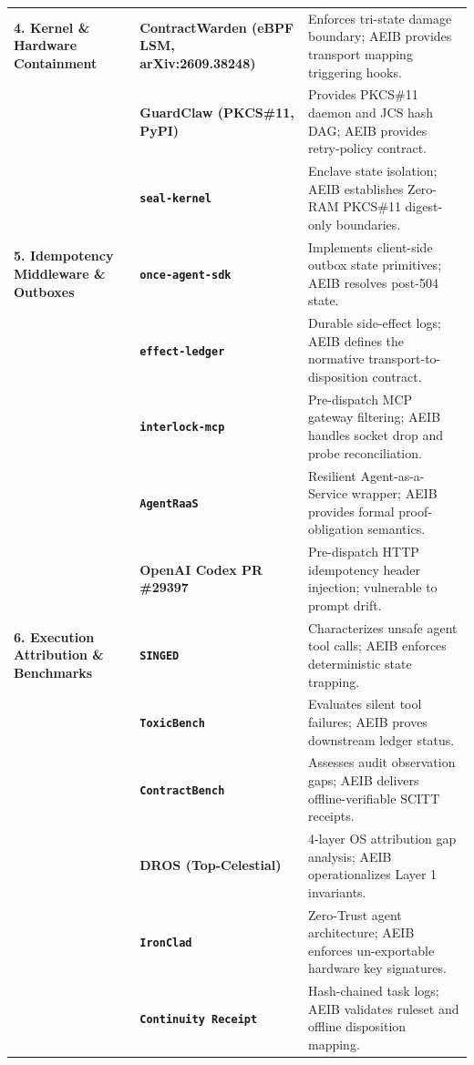 \documentclass[10pt,journal,compsoc]{IEEEtran}
\begin{document}
\begin{table}[t]
\begin{tabular}{lll}
\midrule
\textbf{4. Kernel \& Hardware Containment} & \textbf{ContractWarden (eBPF LSM, arXiv:2609.38248)}~\cite{contractwarden2026} & Enforces tri-state damage boundary; AEIB provides transport mapping triggering hooks. \\
 & \textbf{GuardClaw (PKCS\#11, PyPI)}~\cite{guardclaw2026} & Provides PKCS\#11 daemon and JCS hash DAG; AEIB provides retry-policy contract. \\
 & \textbf{\texttt{seal-kernel}}~\cite{sealkernel2026} & Enclave state isolation; AEIB establishes Zero-RAM PKCS\#11 digest-only boundaries. \\
\midrule
\textbf{5. Idempotency Middleware \& Outboxes} & \textbf{\texttt{once-agent-sdk}}~\cite{onceagentsdk2026} & Implements client-side outbox state primitives; AEIB resolves post-504 state. \\
 & \textbf{\texttt{effect-ledger}}~\cite{effectledger2026} & Durable side-effect logs; AEIB defines the normative transport-to-disposition contract. \\
 & \textbf{\texttt{interlock-mcp}}~\cite{interlockmcp2026} & Pre-dispatch MCP gateway filtering; AEIB handles socket drop and probe reconciliation. \\
 & \textbf{\texttt{AgentRaaS}}~\cite{agentraas2026} & Resilient Agent-as-a-Service wrapper; AEIB provides formal proof-obligation semantics. \\
 & \textbf{OpenAI Codex PR \#29397}~\cite{openaicodex2026} & Pre-dispatch HTTP idempotency header injection; vulnerable to prompt drift. \\
\midrule
\textbf{6. Execution Attribution \& Benchmarks} & \textbf{\texttt{SINGED}}~\cite{singed2026} & Characterizes unsafe agent tool calls; AEIB enforces deterministic state trapping. \\
 & \textbf{\texttt{ToxicBench}}~\cite{toxicbench2026} & Evaluates silent tool failures; AEIB proves downstream ledger status. \\
 & \textbf{\texttt{ContractBench}}~\cite{contractbench2026} & Assesses audit observation gaps; AEIB delivers offline-verifiable SCITT receipts. \\
 & \textbf{DROS (Top-Celestial)}~\cite{dros2025} & 4-layer OS attribution gap analysis; AEIB operationalizes Layer 1 invariants. \\
 & \textbf{\texttt{IronClad}}~\cite{ironclad2026} & Zero-Trust agent architecture; AEIB enforces un-exportable hardware key signatures. \\
 & \textbf{\texttt{Continuity Receipt}}~\cite{continuity2026} & Hash-chained task logs; AEIB validates ruleset and offline disposition mapping. \\
\bottomrule
\end{tabular}
\end{table}
\end{document}
